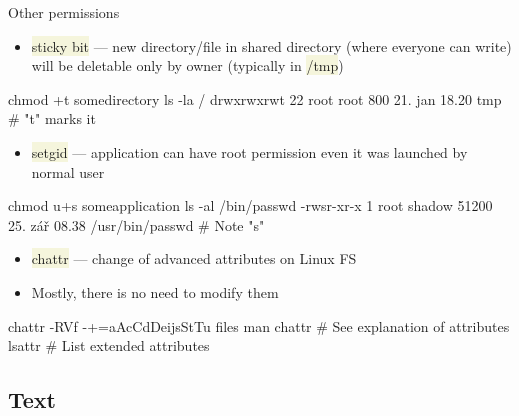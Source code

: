 \documentclass[compress, xelatex, 11pt, xcolor=svgnames, aspectratio=169,
	hyperref={
		bookmarks=true,
		unicode=true,
		colorlinks=true,
		pdftitle={Linux, command line and MetaCentrum},
		plainpages=false,
		pdfauthor={Vojtech Zeisek},
		pdfsubject={Course about use of Linux command line, writing shell scripts and using MetaCentrum of CESNET},
		pdfcreator={XeLaTeX},
		pdfkeywords={Linux, GNU, BASH, shell, command line, MetaCentrum},
		linkcolor=DarkRed, %
		anchorcolor=DarkBlue, %
		citecolor=Indigo, %
		filecolor=NavyBlue, %
		menucolor=DarkMagenta, %
		urlcolor=DarkBlue, %
		},
	url={hyphens, lowtilde} %
	]{beamer}
\renewcommand{\texttt}[1]{\colorbox{Beige}{{\ttfamily #1}}}
\begin{document}
\begin{frame}[fragile]{Other permissions}
	\begin{itemize}
		\item \texttt{sticky bit} --- new directory/file in shared directory (where everyone can write) will be deletable only by owner (typically in \texttt{/tmp})
	\end{itemize}
	\vfill
	\begin{bashcode}
    chmod +t somedirectory
    ls -la /
    drwxrwxrwt 22 root root 800 21. jan 18.20 tmp # "t" marks it
	\end{bashcode}
	\vfill
	\begin{itemize}
		\item \texttt{setgid} --- application can have root permission even it was launched by normal user
	\end{itemize}
	\vfill
	\begin{bashcode}
    chmod u+s someapplication
    ls -al /bin/passwd
    -rwsr-xr-x 1 root shadow 51200 25. zář 08.38 /usr/bin/passwd # Note "s"
	\end{bashcode}
	\vfill
	\begin{itemize}
		\item \texttt{chattr} --- change of advanced attributes on Linux FS
		\item Mostly, there is no need to modify them
	\end{itemize}
	\vfill
	\begin{bashcode}
    chattr -RVf -+=aAcCdDeijsStTu files
    man chattr # See explanation of attributes
    lsattr # List extended attributes
	\end{bashcode}
\end{frame}

\subsection{Text}
\end{document}
